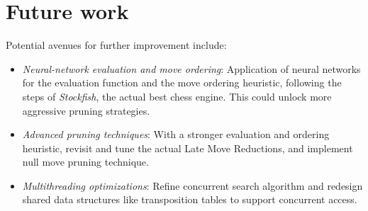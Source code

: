 \section{Future work}

\noindent Potential avenues for further improvement include:

\begin{itemize}[itemsep=1pt]
    \item \textit{Neural-network evaluation and move ordering}:  
    Application of neural networks for the evaluation function and the move ordering heuristic, following the steps of \textit{Stockfish}, the actual best chess engine. This could unlock more aggressive pruning strategies.
    \item \textit{Advanced pruning techniques}:  
    With a stronger evaluation and ordering heuristic, revisit and tune the actual Late Move Reductions, and implement null move pruning technique.
    \item \textit{Multithreading optimizations}:  
    Refine concurrent search algorithm and redesign shared data structures like transposition tables to support concurrent access.
\end{itemize}
